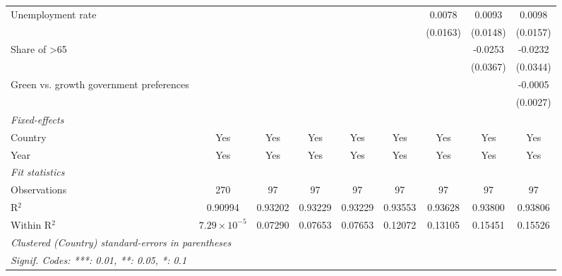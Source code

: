 \begin{table}[htbp]
\begin{tabular}{lcccccccc}
      Unemployment rate                                     &                       &          &          &          &          & 0.0078   & 0.0093   & 0.0098\\   
                                                            &                       &          &          &          &          & (0.0163) & (0.0148) & (0.0157)\\   
      Share of >65                                          &                       &          &          &          &          &          & -0.0253  & -0.0232\\   
                                                            &                       &          &          &          &          &          & (0.0367) & (0.0344)\\   
      Green vs. growth government preferences               &                       &          &          &          &          &          &          & -0.0005\\   
                                                            &                       &          &          &          &          &          &          & (0.0027)\\   
      \midrule
      \emph{Fixed-effects}\\
      Country                                               & Yes                   & Yes      & Yes      & Yes      & Yes      & Yes      & Yes      & Yes\\  
      Year                                                  & Yes                   & Yes      & Yes      & Yes      & Yes      & Yes      & Yes      & Yes\\  
      \midrule
      \emph{Fit statistics}\\
      Observations                                          & 270                   & 97       & 97       & 97       & 97       & 97       & 97       & 97\\  
      R$^2$                                                 & 0.90994               & 0.93202  & 0.93229  & 0.93229  & 0.93553  & 0.93628  & 0.93800  & 0.93806\\  
      Within R$^2$                                          & $7.29\times 10^{-5}$  & 0.07290  & 0.07653  & 0.07653  & 0.12072  & 0.13105  & 0.15451  & 0.15526\\  
      \midrule \midrule
      \multicolumn{9}{l}{\emph{Clustered (Country) standard-errors in parentheses}}\\
      \multicolumn{9}{l}{\emph{Signif. Codes: ***: 0.01, **: 0.05, *: 0.1}}\\
   \end{tabular}
\end{table}


